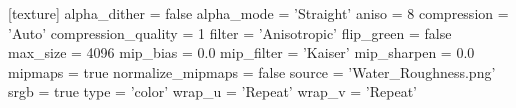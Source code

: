 [texture]
alpha_dither = false
alpha_mode = 'Straight'
aniso = 8
compression = 'Auto'
compression_quality = 1
filter = 'Anisotropic'
flip_green = false
max_size = 4096
mip_bias = 0.0
mip_filter = 'Kaiser'
mip_sharpen = 0.0
mipmaps = true
normalize_mipmaps = false
source = 'Water_Roughness.png'
srgb = true
type = 'color'
wrap_u = 'Repeat'
wrap_v = 'Repeat'